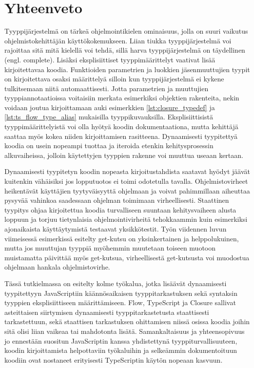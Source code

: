 \chapter{Yhteenveto}

Tyyppijärjestelmä on tärkeä ohjelmointikielen ominaisuus, jolla on suuri
vaikutus ohjelmistokehittäjän käyttökokemukseen.
Liian tiukka tyyppijärjestelmä voi rajoittaa sitä mitä kielellä voi tehdä,
sillä harva tyyppijärjestelmä on täydellinen (engl. complete).
Lisäksi eksplisiittiset tyyppimäärittelyt vaativat lisää kirjoitettavaa koodia.
Funktioiden parametrien ja luokkien jäsenmuuttujien tyypit on kirjoitettava
osaksi määrittelyä silloin kun tyyppijärjestelmä ei kykene tulkitsemaan
niitä automaattisesti. Jotta parametrien ja muuttujien tyyppiannotaatioissa
voitaisiin merkata esimerkiksi objektien rakenteita, nekin voidaan
joutua kirjoittamaan auki esimerkkien \ref{lst:closure_typedef} ja
\ref{lst:ts_flow_type_alias} mukaisilla tyyppikuvauksilla.
Eksplisiittisistä tyyppimäärittelyistä voi olla hyötyä
koodin dokumentaationa, mutta kehittäjä saattaa myös kokea niiden
kirjoittamisen rasitteena. Dynaamisesti tyypitettyä koodia on usein
nopeampi tuottaa ja iteroida etenkin kehitysprosessin alkuvaiheissa, jolloin
käytettyjen tyyppien rakenne voi muuttua useaan kertaan. 

Dynaamisesti tyypitetyn koodin nopeasta kirjoitustahdista saatavat hyödyt jäävät kuitenkin
vähäisiksi jos lopputuotos ei toimi odotetulla tavalla. Ohjelmistovirheet heikentävät
käyttäjien tyytyväisyyttä ohjelmaan ja voivat pahimmillaan aiheuttaa
pysyvää vahinkoa saadessaan ohjelman toimimaan virheellisesti.
Staattinen tyypitys ohjaa kirjoitettua koodia turvalliseen suuntaan kehitysvaiheen alusta
loppuun ja torjuu tietynlaisia ohjelmointivirheitä tehokkaammin kuin
esimerkiksi ajonaikaista käyttäytymistä testaavat yksikkötestit.
Työn viidennen luvun viimeisessä esimerkissä esitelty get-kutsu on yksinkertainen
ja helppolukuinen, mutta jos muuttujan  tyyppiä myöhemmin
muutetaan toiseen muotoon muistamatta päivittää myös get-kutsua, virheellisestä
get-kutsusta voi muodostua ohjelmaan hankala ohjelmistovirhe.

Tässä tutkielmassa on esitelty kolme työkalua, jotka lisäävät dynaamisesti
tyypitettyyn JavaScriptiin käännösaikaisen tyyppitarkastuksen sekä syntaksin
tyyppien eksplisiittiseen määrittämiseen. Flow, TypeScript ja Closure
sallivat asteittaisen siirtymisen dynaamisesti tyyppitarkastetusta staattisesti
tarkastettuun, sekä staattisen tarkastuksen ohittamisen niissä osissa koodia
joihin sitä olisi liian vaikeaa tai mahdotonta lisätä.
Samankaltaisuus ja yhteensopivuus jo ennestään suositun JavaScriptin kanssa
yhdistettynä tyyppiturvallisuuteen, koodin kirjoittamista helpottaviin
työkaluihin ja selkeämmin dokumentoituun koodiin ovat nostaneet erityisesti
TypeScriptin käytön nopeaan kasvuun.
